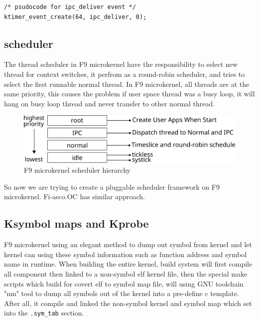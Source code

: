 \documentclass[10pt,preprint,nocopyrightspace]{sigplanconf}
\begin{document}
\begin{lstlisting}[basicstyle=\small,frame=single]
/* psudocode for ipc_deliver event */
ktimer_event_create(64, ipc_deliver, 0);
\end{lstlisting}

\subsection{scheduler}

The thread scheduler in F9 microkernel have the responsibility to select new thread for context switches, it perfrom as a round-robin scheduler, and tries to select the first runnable normal thread. In F9 microkernel, all threads are at the same priority, this causes the problem if user space thread was a busy loop, it will hang on busy loop thread and never transfer to other normal thread.

\begin{figure}[H]
	\begin{center}
		\includegraphics[width=\linewidth]{picture/scheduler.png}
	\end{center}
	\caption{F9 microkernel scheduler hierarchy}
\end{figure}

So now we are trying to create a pluggable scheduler framework on F9 microkernel.  Fi-asco.OC has similar approach\cite{elphinstone2013l3,fiasco}.

\subsection{Ksymbol maps and Kprobe}
F9 microkernel using an elegant method to dump out symbol from kernel and let kernel can using these symbol information such as function address and symbol name in runtime. When building the entire kernel, build system will first compile all component then linked to a non-symbol elf kernel file, then the special make scripts which build for covert elf to symbol map file, will using GNU toolchain "nm" tool to dump all symbols out of the kernel into a pre-define c template. After all, it compile and linked the non-symbol kernel and symbol map which set into the \texttt{.sym\_tab} section.
\end{document}
